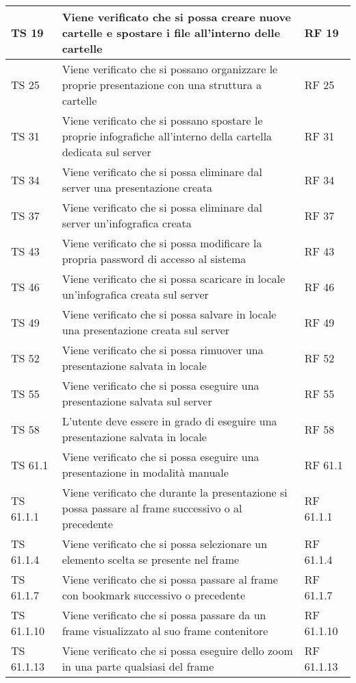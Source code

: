 {{\begin{longtable} [c]{| p{3cm} | p{6cm} |p{3cm}|}
			\hline
			TS 19 & Viene verificato che si possa creare nuove cartelle e spostare i file all'interno delle cartelle & RF 19\\
			\hline
			TS 25 & Viene verificato che si possano organizzare le proprie presentazione con una struttura a cartelle & RF 25\\
			\hline
			TS 31 & Viene verificato che si possano spostare le proprie infografiche all'interno della cartella dedicata sul server & RF 31\\
			\hline
			TS 34 & Viene verificato che si possa eliminare dal server una presentazione creata & RF 34\\
			\hline
			TS 37 & Viene verificato che si possa eliminare dal server un'infografica creata & RF 37\\
			\hline
			TS 43 & Viene verificato che si possa modificare la propria password di accesso al sistema & RF 43\\
			\hline
			TS 46 & Viene verificato che si possa scaricare in locale un'infografica creata sul server & RF 46\\
			\hline
			TS 49 & Viene verificato che si possa salvare in locale una presentazione creata sul server & RF 49\\
			\hline
			TS 52 & Viene verificato che si possa rimuover una presentazione salvata in locale & RF 52\\
			\hline
			TS 55 & Viene verificato che si possa eseguire una presentazione salvata sul server & RF 55\\
			\hline
			TS 58 & L'utente deve essere in grado di eseguire una presentazione salvata in locale & RF 58\\
			\hline
			TS 61.1 & Viene verificato che si possa eseguire una presentazione in modalità manuale & RF 61.1\\
			\hline
			TS 61.1.1 & Viene verificato che durante la presentazione si possa passare al frame successivo o al precedente & RF 61.1.1\\
			\hline
			TS 61.1.4 & Viene verificato che si possa selezionare un elemento scelta se presente nel frame & RF 61.1.4\\
			\hline
			TS 61.1.7 & Viene verificato che si possa passare al frame con bookmark successivo o precedente & RF 61.1.7\\
			\hline
			TS 61.1.10 & Viene verificato che si possa passare da un frame visualizzato al suo frame contenitore & RF 61.1.10\\
			\hline
			TS 61.1.13 & Viene verificato che si possa eseguire dello zoom in una parte qualsiasi del frame & RF 61.1.13\\

\end{longtable}}}
